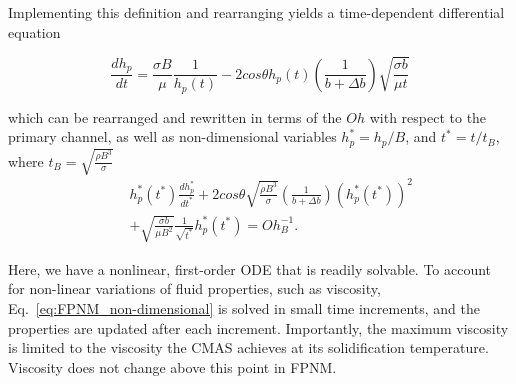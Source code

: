 \documentclass[%
 aip,
 amsmath,amssymb,
 reprint,%
floatfix]{revtex4-1}
\begin{document}
\noindent Implementing this definition and rearranging yields a time-dependent differential equation

\begin{equation}
    \frac{dh_{p}}{dt} = \frac{\sigma B}{\mu} \frac{1}{h_{p}(t)} - 2 cos\theta h_{p}(t) \left( \frac{1}{b+\Delta b} \right) \sqrt{\frac{\sigma b}{\mu t}}
    \label{eq:FPNM_dimensional}
\end{equation}

\noindent which can be rearranged and rewritten in terms of the $Oh$ with respect to the primary channel, as well as non-dimensional variables $h_p^* = h_p/B$, and $t^* = t/t_{B}$, where $t_{B} = \sqrt{\frac{\rho B^{3}}{\sigma}}$
\begin{eqnarray}
\label{eq:FPNM_non-dimensional}
    &&h_{p}^{*}\left(t^{*}\right)\frac{dh_{p}^{*}}{dt^{*}} + 2 cos\theta \sqrt{\frac{\rho B^{3}}{\sigma}} \left( \frac{1}{b+\Delta b} \right)\left(h_{p}^{*}\left(t^{*}\right)\right)^{2} \\
    && + \sqrt{\frac{\sigma b}{\mu B^{2}}} \frac{1}{\sqrt{t^{*}}} h_{p}^{*} \left(t^{*}\right) = Oh_{B}^{-1}. \nonumber
\end{eqnarray}



\noindent Here, we have a nonlinear, first-order ODE that is readily solvable. To account for non-linear variations of fluid properties, such as viscosity, Eq.~\ref{eq:FPNM_non-dimensional} is solved in small time increments, and the properties are updated after each increment. Importantly, the maximum viscosity is limited to the viscosity the CMAS achieves at its solidification temperature. Viscosity does not change above this point in FPNM.

\end{document}
